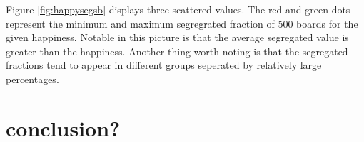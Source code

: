 \documentclass{article}
\begin{document}
Figure \ref{fig:happysegsb} displays three scattered values. The red and green dots represent the minimum and maximum segregrated fraction of 500 boards for the given happiness. Notable in this picture is that the average segregated value is greater than the happiness. 
Another thing worth noting is that the segregated fractions tend to appear in different groups seperated by relatively large percentages.
\section{conclusion?}
\end{document}
